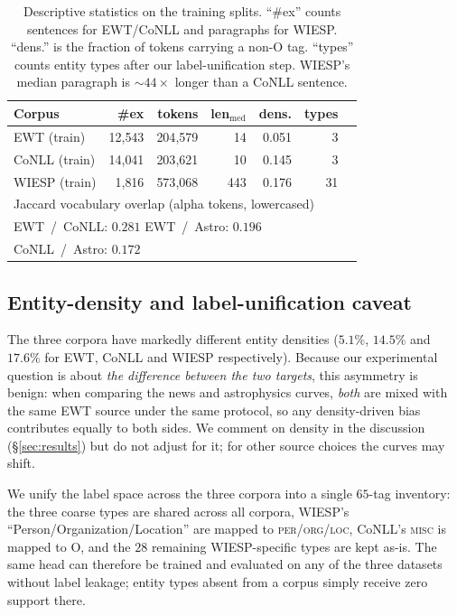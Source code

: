 \documentclass[11pt]{article}
\begin{document}
\begin{table}[t]
  \centering
  \small
  \begin{tabular}{lrrrrrr}
    \toprule
    Corpus & \#ex & tokens & len$_{\text{med}}$ & dens. & types \\
    \midrule
    EWT (train)        & 12{,}543 & 204{,}579 & 14   & 0.051 & 3 \\
    CoNLL (train)      & 14{,}041 & 203{,}621 & 10   & 0.145 & 3 \\
    WIESP (train)      &  1{,}816 & 573{,}068 & 443  & 0.176 & 31 \\
    \midrule
    \multicolumn{6}{l}{Jaccard vocabulary overlap (alpha tokens, lowercased)} \\
    \multicolumn{6}{l}{\hspace*{1em}EWT~/~CoNLL: $0.281$ \quad EWT~/~Astro: $0.196$} \\
    \multicolumn{6}{l}{\hspace*{1em}CoNLL~/~Astro: $0.172$} \\
    \bottomrule
  \end{tabular}
  \caption{Descriptive statistics on the training splits. ``\#ex'' counts
    sentences for EWT/CoNLL and paragraphs for WIESP. ``dens.'' is the
    fraction of tokens carrying a non-\textsf{O} tag. ``types'' counts entity
    types after our label-unification step. WIESP's median paragraph is
    $\sim$$44\times$ longer than a CoNLL sentence.}
  \label{tab:datasets}
\end{table}

\subsection{Entity-density and label-unification caveat}
\label{sec:density}

The three corpora have markedly different entity densities ($5.1\%$, $14.5\%$
and $17.6\%$ for EWT, CoNLL and WIESP respectively). Because our experimental
question is about \emph{the difference between the two targets}, this
asymmetry is benign: when comparing the news and astrophysics curves,
\emph{both} are mixed with the same EWT source under the same protocol, so
any density-driven bias contributes equally to both sides. We comment on
density in the discussion (\S\ref{sec:results}) but do not adjust for it; for
other source choices the curves may shift.

We unify the label space across the three corpora into a single $65$-tag
inventory: the three coarse types are shared across all corpora, WIESP's
``Person/Organization/Location'' are mapped to \textsc{per}/\textsc{org}/\textsc{loc},
CoNLL's \textsc{misc} is mapped to \textsf{O}, and the $28$ remaining
WIESP-specific types are kept as-is. The same head can therefore be trained
and evaluated on any of the three datasets without label leakage; entity
types absent from a corpus simply receive zero support there.
\end{document}
